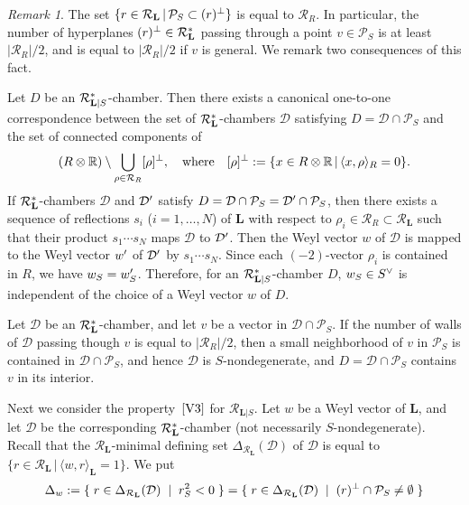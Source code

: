 \documentclass{amsart}
\theoremstyle{plain}
\theoremstyle{definition}
\theoremstyle{remark}
\newtheorem{remark}[theorem]{Remark}
\numberwithin{equation}{section}
\numberwithin{table}{section}
\numberwithin{figure}{section}
\newcommand{\R}{\mathord{\mathbb R}}
\newcommand{\DDD}{\mathord{\mathcal D}}
\newcommand{\PPP}{\mathord{\mathcal P}}
\newcommand{\RRR}{\mathord{\mathcal R}}
\newcommand{\set}[2]{\{\; {#1} \; \mid \; {#2} \;  \}}
\newcommand{\shortset}[2]{\{ {#1} \,|\, {#2}   \}}
\newcommand{\tensor}{\otimes}
\newcommand{\sprime}{\sp\prime}
\newcommand{\sperp}{\sp{\perp}}
\newcommand{\dual}{\sp{\vee}}
\renewcommand{\L}{\mathord{\mathbf{L}}}
\newcommand{\intM}[2]{\langle{#1}\rangle_{#2}}
\newcommand{\Roots}{\RRR}
\newcommand{\sphyp}{\sp*}
\newcommand{\RtsLS}{\Roots_{\L|S}}
\newcommand{\propVthree}{\mathord{\rm [V3]}}
\begin{document}
\begin{remark}\label{rem:DDDs}
% 
The set $\shortset{r\in \Roots_{\L}}{\PPP_S\subset (r)\sperp}$
is equal to $\Roots_{R}$.
In particular, the number of hyperplanes $(r)\sperp\in \Roots_{\L}\sphyp$
passing through a point $v\in \PPP_S$ is at least $|\Roots_{R}|/2$,
and is equal to $|\Roots_{R}|/2$ if $v$ is general.
We remark two consequences of this fact.
\par
Let $D$ be an $\RtsLS\sphyp$-chamber.
Then there exists a canonical one-to-one correspondence
between the set of $\Roots_{\L}\sphyp$-chambers $\DDD$ satisfying  $D=\DDD\cap\PPP_S$
and the set of connected components of
$$
(R\tensor\R) \setminus \bigcup_{\rho\in \Roots_R} [\rho]\sperp,
\quad \textrm{where}\quad
[\rho]\sperp:=\shortset{x\in R\tensor\R}{\intM{x, \rho}{R}=0}.
$$
If $\Roots_{\L}\sphyp$-chambers $\DDD$ and $\DDD\sprime$ satisfy $D=\DDD\cap\PPP_S=\DDD\sprime\cap\PPP_S$,
then there exists a sequence of reflections $s_i$ ($i=1, \dots, N$)
of $\L$ with respect to $\rho_i\in \Roots_R\subset \Roots_{\L}$ such that their product 
$s_1\cdots s_N$ maps $\DDD$ to $\DDD\sprime$.
Then the Weyl vector $w$ of $\DDD$ is mapped to the Weyl vector $w\sprime$ of $\DDD\sprime$
by $s_1\cdots s_N$.
Since each $(-2)$-vector $\rho_i$ is contained in $R$,
we  have $w_S=w\sprime_S$.
Therefore,
for an $\RtsLS\sphyp$-chamber $D$,
 $w_S\in S\dual$ is independent of the choice of a Weyl vector $w$ of $D$.
%
\par
% 
Let $\DDD$ be an $\Roots_{\L}\sphyp$-chamber,
and let
 $v$ be a vector in $\DDD\cap \PPP_S$.
If the number of walls of  $\DDD$ 
 passing though $v$ is equal to  
$|\Roots_{R}|/2$,
then a small neighborhood of $v$ in $\PPP_S$ is  contained in $\DDD\cap \PPP_S$,
and hence $\DDD$ is $S$-nondegenerate,
and $D=\DDD\cap \PPP_S$ contains $v$ in its interior.
\end{remark}
%
%
%
%
Next we consider the property~$\propVthree$ for $\RtsLS$.
Let $w$ be a Weyl vector of $\L$,
and let $\DDD$ be the corresponding $\Roots_{\L}\sphyp$-chamber
(not necessarily $S$-nondegenerate).
Recall that the  $\Roots_{\L}$-minimal defining set
$\Delta_{\Roots_{\L}}(\DDD)$ of $\DDD$ is equal to $\shortset{r\in \Roots_{\L}}{\intM{w, r}{\L}=1}$.
We put  
%
\begin{equation}\label{eq:Deltasprime} 
\Delta_{w}:=\set{r\in \Delta_{\Roots_{\L}}(\DDD)}{r_S^2<0}=\set{r\in \Delta_{\Roots_{\L}}(\DDD)}{(r)\sperp\cap\PPP_S\ne\emptyset}
\end{equation}
\end{document}
